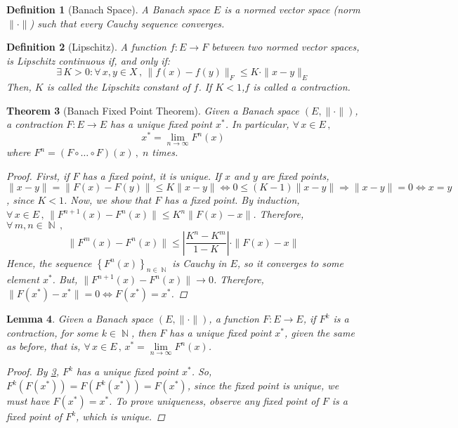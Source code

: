 \documentclass[12pt]{article}
\let\RA\Rightarrow
\let\LR\Leftrightarrow
\newcommand{\Forall}[1]{\forall\,{#1}\,,\,}
\newcommand{\Exist}[1]{\exists\,{#1}:}
\DeclareMathOperator{\N}{\mathbb{N}}
\newcommand{\seq}[2][n]{{\left\{#2\right\}}_{#1\in\N}}
\newtheorem{theorem}{Theorem}[subsection]
\newtheorem{definition}[theorem]{Definition}
\newtheorem{lemma}[theorem]{Lemma}
\begin{document}
\begin{definition}[Banach Space]
  A Banach space $E$ is a normed vector space (norm $\|\cdot\|$) such that every Cauchy sequence converges.
\end{definition}

\begin{definition}[Lipschitz]
  A function $f: E\to F$ between two normed vector spaces, is Lipschitz continuous if, and only if: $$\Exist{K>0}\Forall{x,y\in X}\|f(x)-f(y)\|_F\leq K\cdot \|x-y\|_E$$
  Then, $K$ is called the Lipschitz constant of $f$. If $K<1$,$f$ is called a contraction.
\end{definition}

\begin{theorem}[Banach Fixed Point Theorem]
  \label{banach_fixed}
  Given a Banach space $(E,\|\cdot\|)$, a contraction $F: E\to E$ has a unique fixed point $x^{*}$. In particular, $\Forall{x\in E}$ $$x^{*}=\lim_{n\to\infty}{F^n(x)}$$ where $F^n=(F\circ \dots \circ F)(x)\,,\;n$ times. 
  \begin{proof}
    First, if $F$ has a fixed point, it is unique. If $x$ and $y$ are fixed points, $\|x-y\|=\|F(x)-F(y)\|\leq K \|x-y\|\LR 0 \leq (K-1)\|x-y\|\RA \|x-y\|=0\LR x=y$, since $K<1$. Now, we show  that $F$ has a fixed point. By induction, $\Forall{x\in E} \|F^{n+1}(x)-F^n(x)\|\leq K^n \|F(x)-x\|$. Therefore, $\Forall{m,n\in\N}$ $$\|F^m(x)-F^n(x)\|\leq \left|\frac{K^n-K^m}{1-K}\right|\cdot\|F(x)-x\|$$
    Hence, the sequence $\seq{F^n(x)}$ is Cauchy in $E$, so it converges to some element $x^{*}$. But, $\|F^{n+1}(x)-F^n(x)\|\to 0$. Therefore, $\|F(x^{*})-x^{*}\|=0 \LR F(x^{*})=x^{*}$.
  \end{proof}
\end{theorem}

\begin{lemma}
  \label{iter_banach_fixed}
  Given a Banach space $(E,\|\cdot\|)$, a function $F: E\to E$, if $F^k$ is a contraction, for some $k\in\N$, then $F$ has a unique fixed point $x^{*}$, given the same as before, that is, $\Forall{x\in E}x^{*}=\lim\limits_{n\to\infty}{F^n(x)}$.
  \begin{proof}
    By \ref{banach_fixed}, $F^k$ has a unique fixed point $x^{*}$. So, $F^k(F(x^{*}))=F(F^k(x^*))=F(x^{*})$, since the fixed point is unique, we must have $F(x^{*})=x^{*}$. To prove uniqueness, observe any fixed point of $F$ is a fixed point of $F^k$, which is unique.
  \end{proof}
\end{lemma}
\end{document}

